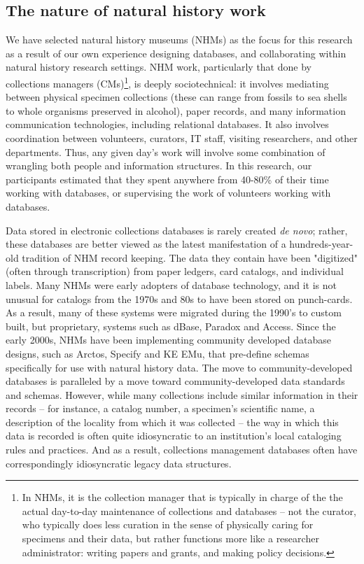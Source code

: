 \subsection{The nature of natural history work}

We have selected natural history museums (NHMs) as the focus for this research as a result of our own experience designing databases, and collaborating within natural history research settings. NHM work, particularly that done by collections managers (CMs)\footnote{In NHMs, it is the collection manager that is typically in charge of the the actual day-to-day maintenance of collections and databases -- not the curator, who typically does less curation in the sense of physically caring for specimens and their data, but rather functions more like a researcher administrator: writing papers and grants, and making policy decisions.}, is deeply sociotechnical: it involves mediating between physical specimen collections (these can range from fossils to sea shells to whole organisms preserved in alcohol), paper records, and many information communication technologies, including relational databases. It also involves coordination between volunteers, curators, IT staff, visiting researchers, and other departments. Thus, any given day’s work will involve some combination of wrangling both people and information structures. In this research, our participants estimated that they spent anywhere from 40-80\% of their time working with databases, or supervising the work of volunteers working with databases.

Data stored in electronic collections databases is rarely created \textit{de novo}; rather, these databases are better viewed as the latest manifestation of a hundreds-year-old tradition of NHM record keeping. The data they contain have been "digitized" (often through transcription) from paper ledgers, card catalogs, and individual labels. Many NHMs were early adopters of database technology, and it is not unusual for catalogs from the 1970s and 80s to have been stored on punch-cards. As a result, many of these systems were migrated during the 1990's to custom built, but proprietary, systems such as dBase, Paradox and Access. Since the early 2000s, NHMs have been implementing community developed database designs, such as Arctos, Specify and KE EMu, that pre-define schemas specifically for use with natural history data. The move to community-developed databases is paralleled by a move toward community-developed data standards and schemas. However, while many collections include similar information in their records – for instance, a catalog number, a specimen’s scientific name, a description of the locality from which it was collected – the way in which this data is recorded is often quite idiosyncratic to an institution’s local cataloging rules and practices. And as a result, collections management databases often have correspondingly idiosyncratic legacy data structures.

